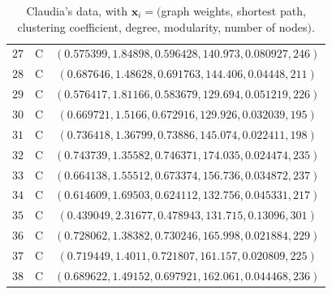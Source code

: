 \documentclass[\ifafour a4paper,12pt,\else a5paper,10pt,\fi%
onecolumn,oneside,article,%
british%
]{memoir}
\theoremstyle{remark}
\theoremstyle{innote}
\renewcommand*{\|}{\mathpunct{|}}
\newcommand*{\yH}{H}
\newcommand*{\yx}{x}
\newcommand*{\yxx}{\bm{\yx}}
\theoremstyle{plain}
\begin{document}
\begin{table}[!h]
\begin{tabular}[t]{@{}c@{\quad}c@{\quad}c@{}}
$27$ & C & $(0.575399, 1.84898, 0.596428, 140.973, 0.080927, 246)$ \\
$28$ & C & $(0.687646, 1.48628, 0.691763, 144.406, 0.04448, 211)$ \\
$29$ & C & $(0.576417, 1.81166, 0.583679, 129.694, 0.051219, 226)$ \\
$30$ & C & $(0.669721, 1.5166, 0.672916, 129.926, 0.032039, 195)$ \\
$31$ & C & $(0.736418, 1.36799, 0.73886, 145.074, 0.022411, 198)$ \\
$32$ & C & $(0.743739, 1.35582, 0.746371, 174.035, 0.024474, 235)$ \\
$33$ & C & $(0.664138, 1.55512, 0.673374, 156.736, 0.034872, 237)$ \\
$34$ & C & $(0.614609, 1.69503, 0.624112, 132.756, 0.045331, 217)$ \\
$35$ & C & $(0.439049, 2.31677, 0.478943, 131.715, 0.13096, 301)$ \\
$36$ & C & $(0.728062, 1.38382, 0.730246, 165.998, 0.021884, 229)$ \\
$37$ & C & $(0.719449, 1.4011, 0.721807, 161.157, 0.020809, 225)$ \\
$38$ & C & $(0.689622, 1.49152, 0.697921, 162.061, 0.044468, 236)$ 
    \end{tabular}
    \caption{Claudia's data, with
      $\yxx_i=($graph weights, shortest path, clustering
        coefficient, degree, modularity, number of
        nodes$)$.}
  \label{tab:simones_data}
\end{table}
\end{document}
